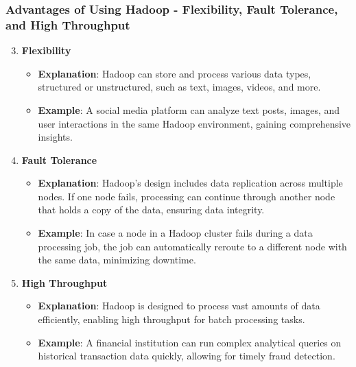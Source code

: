 \documentclass[aspectratio=169]{beamer}
\begin{document}
\begin{frame}[fragile]
    \frametitle{Advantages of Using Hadoop - Flexibility, Fault Tolerance, and High Throughput}
    \begin{enumerate}
        \setcounter{enumi}{2}
        \item \textbf{Flexibility}
        \begin{itemize}
            \item \textbf{Explanation}: Hadoop can store and process various data types, structured or unstructured, such as text, images, videos, and more. 
            \item \textbf{Example}: A social media platform can analyze text posts, images, and user interactions in the same Hadoop environment, gaining comprehensive insights.
        \end{itemize}

        \item \textbf{Fault Tolerance}
        \begin{itemize}
            \item \textbf{Explanation}: Hadoop's design includes data replication across multiple nodes. If one node fails, processing can continue through another node that holds a copy of the data, ensuring data integrity.
            \item \textbf{Example}: In case a node in a Hadoop cluster fails during a data processing job, the job can automatically reroute to a different node with the same data, minimizing downtime.
        \end{itemize}

        \item \textbf{High Throughput}
        \begin{itemize}
            \item \textbf{Explanation}: Hadoop is designed to process vast amounts of data efficiently, enabling high throughput for batch processing tasks.
            \item \textbf{Example}: A financial institution can run complex analytical queries on historical transaction data quickly, allowing for timely fraud detection.
        \end{itemize}
    \end{enumerate}
\end{frame}
\end{document}
